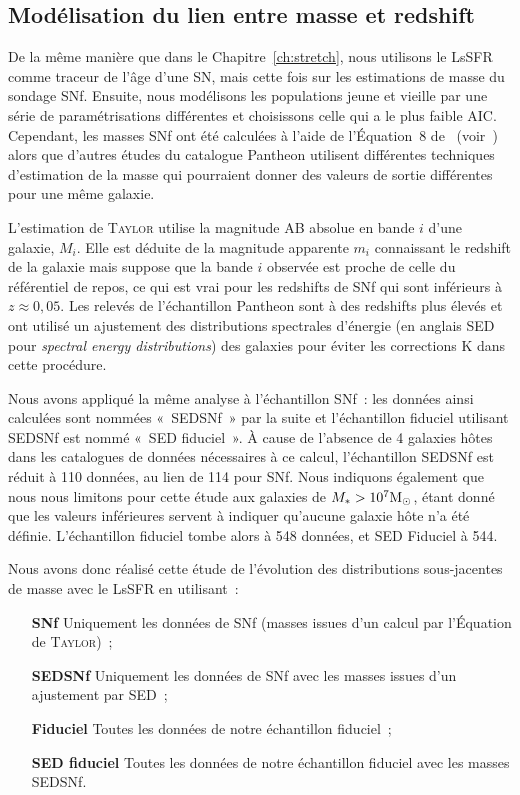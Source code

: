\documentclass[../main/main.tex]{subfiles}
\begin{document}
\subsection{Modélisation du lien entre masse et redshift}\label{ssec:mmod}

De la même manière que dans le Chapitre~\ref{ch:stretch}, nous utilisons le
LsSFR comme traceur de l'âge d'une SN, mais cette fois sur les estimations de
masse du sondage SNf. Ensuite, nous modélisons les populations jeune et vieille
par une série de paramétrisations différentes et choisissons celle qui a le plus
faible AIC. Cependant, les masses SNf ont été calculées à l'aide de l'Équation~8
de~\cite{taylor2011} (voir~\cite{rigault2020}) alors que d'autres études du
catalogue Pantheon utilisent différentes techniques d'estimation de la masse qui
pourraient donner des valeurs de sortie différentes pour une même galaxie.

L'estimation de \textsc{Taylor} utilise la magnitude AB absolue en bande $i$
d'une galaxie, $M_i$. Elle est déduite de la magnitude apparente $m_i$
connaissant le redshift de la galaxie mais suppose que la bande $i$ observée est
proche de celle du référentiel de repos, ce qui est vrai pour les redshifts de
SNf qui sont inférieurs à $z\approx 0,05$. Les relevés de l'échantillon Pantheon
sont à des redshifts plus élevés et ont utilisé un ajustement des distributions
spectrales d'énergie (en anglais SED pour \textit{spectral energy
distributions}) des galaxies pour éviter les corrections K dans cette procédure.

Nous avons appliqué la même analyse à l'échantillon SNf~: les données ainsi
calculées sont nommées «~SEDSNf~» par la suite et l'échantillon fiduciel
utilisant SEDSNf est nommé «~SED fiduciel~». À cause de l'absence de 4 galaxies
hôtes dans les catalogues de données nécessaires à ce calcul, l'échantillon
SEDSNf est réduit à 110 données, au lien de 114 pour SNf. Nous indiquons
également que nous nous limitons pour cette étude aux galaxies de $M_* >
10^7\si{\Msun}$, étant donné que les valeurs inférieures servent à indiquer
qu'aucune galaxie hôte n'a été définie. L'échantillon fiduciel tombe alors à
548 données, et SED Fiduciel à 544.

Nous avons donc réalisé cette étude de l'évolution des distributions
sous-jacentes de masse avec le LsSFR en utilisant~:
\begin{enumerate}
    \item [\bfseries SNf] Uniquement les données de SNf (masses issues d'un
        calcul par l'Équation de \textsc{Taylor})~;
    \item [\bfseries SEDSNf] Uniquement les données de SNf avec les masses
        issues d'un ajustement par SED~;
    \item [\bfseries Fiduciel] Toutes les données de notre échantillon
        fiduciel~;
    \item [\bfseries SED fiduciel] Toutes les données de notre échantillon
        fiduciel avec les masses SEDSNf.
\end{enumerate}
\end{document}
